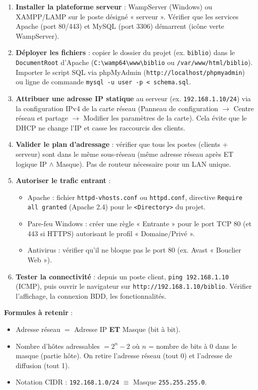\documentclass[11pt]{article}
\begin{document}
\begin{methode}
\begin{enumerate}
\item \textbf{Installer la plateforme serveur} : WampServer (Windows) ou XAMPP/LAMP sur le poste désigné « serveur ». Vérifier que les services Apache (port 80/443) et MySQL (port 3306) démarrent (icône verte WampServer).
\item \textbf{Déployer les fichiers} : copier le dossier du projet (ex. \texttt{biblio}) dans le \texttt{DocumentRoot} d'Apache (\texttt{C:\textbackslash wamp64\textbackslash www\textbackslash biblio} ou \texttt{/var/www/html/biblio}). Importer le script SQL via phpMyAdmin (\texttt{http://localhost/phpmyadmin}) ou ligne de commande \texttt{mysql -u user -p < schema.sql}.
\item \textbf{Attribuer une adresse IP statique} au serveur (ex. \texttt{192.168.1.10/24}) via la configuration IPv4 de la carte réseau (Panneau de configuration $\rightarrow$ Centre réseau et partage $\rightarrow$ Modifier les paramètres de la carte). Cela évite que le DHCP ne change l'IP et casse les raccourcis des clients.
\item \textbf{Valider le plan d'adressage} : vérifier que tous les postes (clients + serveur) sont dans le même sous-réseau (même adresse réseau après ET logique IP $\land$ Masque). Pas de routeur nécessaire pour un LAN unique.
\item \textbf{Autoriser le trafic entrant} :
      \begin{itemize}
      \item Apache : fichier \texttt{httpd-vhosts.conf} ou \texttt{httpd.conf}, directive \texttt{Require all granted} (Apache 2.4) pour le \texttt{<Directory>} du projet.
      \item Pare-feu Windows : créer une règle « Entrante » pour le port TCP 80 (et 443 si HTTPS) autorisant le profil « Domaine/Privé ».
      \item Antivirus : vérifier qu'il ne bloque pas le port 80 (ex. Avast « Bouclier Web »).
      \end{itemize}
\item \textbf{Tester la connectivité} : depuis un poste client, \texttt{ping 192.168.1.10} (ICMP), puis ouvrir le navigateur sur \texttt{http://192.168.1.10/biblio}. Vérifier l'affichage, la connexion BDD, les fonctionnalités.
\end{enumerate}
\textbf{Formules à retenir} :
\begin{itemize}
\item Adresse réseau $=$ Adresse IP \textbf{ET} Masque (bit à bit).
\item Nombre d'hôtes adressables $= 2^{n} - 2$ où $n$ = nombre de bits à 0 dans le masque (partie hôte). On retire l'adresse réseau (tout 0) et l'adresse de diffusion (tout 1).
\item Notation CIDR : \texttt{192.168.1.0/24} $\equiv$ Masque \texttt{255.255.255.0}.
\end{itemize}
\end{methode}
\end{document}
